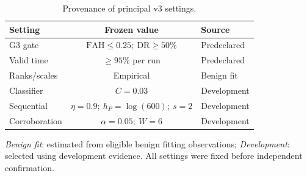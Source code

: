 \begin{table}[!t]
\centering
\caption{Provenance of principal v3 settings.}
\label{tab:parameter_provenance}

{\scriptsize
\setlength{\tabcolsep}{2.0pt}
\renewcommand{\arraystretch}{1.12}

\begin{tabular*}{\columnwidth}{@{\extracolsep{\fill}}lcl@{}}
\toprule

\textbf{Setting} &
\textbf{Frozen value} &
\textbf{Source} \\

\midrule

G3 gate
& \(\mathrm{FAH}\leq0.25;\ \mathrm{DR}\geq50\%\)
& Predeclared \\

Valid time
& \(\geq95\%\) per run
& Predeclared \\

Ranks/scales
& Empirical
& Benign fit \\

Classifier
& \(C=0.03\)
& Development \\

Sequential
& \(\eta=0.9;\ h_P=\log(600);\ s=2\)
& Development \\

Corroboration
& \(\alpha=0.05;\ W=6\)
& Development \\

\bottomrule
\end{tabular*}
}

\vspace{2pt}
{\scriptsize\raggedright
\emph{Benign fit}: estimated from eligible benign fitting observations;
\emph{Development}: selected using development evidence.
All settings were fixed before independent confirmation.
\par}
\end{table}

